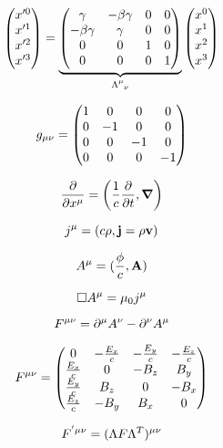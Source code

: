 \documentclass[11pt,twoside]{article}
\begin{document}
\begin{multicols}{3}
\begin{equation}
\mqty(x'^0 \\ x'^1 \\ x'^2 \\ x'^3) = \underbrace{\mqty(\gamma&-\beta\gamma&0&0 \\ -\beta\gamma&\gamma&0&0 \\ 0&0&1&0 \\ 0&0&0&1)}_{\Lambda\indices{^\mu_\nu}}\mqty(x^0 \\ x^1 \\ x^2 \\ x^3)
\end{equation}

\begin{equation}
g_{\mu\nu} = \mqty(\dmat[0]{1,-1,-1,-1})
\end{equation}

\begin{equation}
\pdv{x\indices{^\mu}} = \left(\frac{1}{c}\pdv{t}, \gradient \right)
\end{equation}

\begin{equation}
j\indices{^\mu} = (c\rho, \vb{j} = \rho \vb{v})
\end{equation}

\begin{equation}
A\indices{^\mu} = (\frac{\phi}{c}, \vb{A})
\end{equation}

\begin{equation}
\Box A\indices{^\mu} = \mu_0 j\indices{^\mu}
\end{equation}

\begin{equation}
F\indices{^{\mu\nu}} = \partial\indices{^\mu}A\indices{^\nu} - \partial\indices{^\nu}A\indices{^\mu} 
\end{equation}

\begin{equation}
F\indices{^{\mu\nu}} = \mqty(0&-\frac{E_x}{c}&-\frac{E_y}{c}&-\frac{E_z}{c} \\ \frac{E_x}{c}&0&-B_z&B_y \\ \frac{E_y}{c}&B_z&0&-B_x\\\frac{E_z}{c}&-B_y&B_x&0)
\end{equation}

\begin{equation}
F\indices{^{'\mu\nu}} = (\Lambda F \Lambda^T)\indices{^{\mu\nu}}
\end{equation}


\end{multicols}
\end{document}
